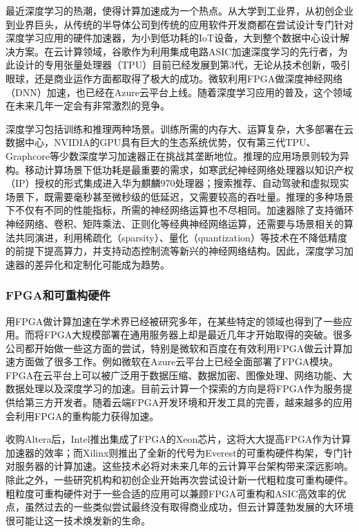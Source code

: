 最近深度学习的热潮，使得计算加速成为一个热点。从大学到工业界，从初创企业到业界巨头，从传统的半导体公司到传统的应用软件开发商都在尝试设计专门针对深度学习应用的硬件加速器，为小到低功耗的IoT设备，大到整个数据中心设计解决方案。在云计算领域，谷歌作为利用集成电路ASIC加速深度学习的先行者，为此设计的专用张量处理器（TPU）目前已经发展到第3代，无论从技术创新，吸引眼球，还是商业运作方面都取得了极大的成功。微软利用FPGA做深度神经网络（DNN）加速，也已经在Azure云平台上线。随着深度学习应用的普及，这个领域在未来几年一定会有非常激烈的竞争。

深度学习包括训练和推理两种场景。训练所需的内存大、运算复杂，大多部署在云数据中心，NVIDIA的GPU具有巨大的生态系统优势，仅有第三代TPU、Graphcore等少数深度学习加速器正在挑战其垄断地位。推理的应用场景则较为异构。移动计算场景下低功耗是最重要的需求，如寒武纪神经网络处理器以知识产权（IP）授权的形式集成进入华为麒麟970处理器；搜索推荐、自动驾驶和虚拟现实场景下，既需要毫秒甚至微秒级的低延迟，又需要较高的吞吐量。推理的多种场景下不仅有不同的性能指标，所需的神经网络运算也不尽相同。加速器除了支持循环神经网络、卷积、矩阵乘法、正则化等经典神经网络运算，还需要与场景相关的算法共同演进，利用稀疏化（sparsity）、量化（quantization）等技术在不降低精度的前提下提高算力，并支持动态控制流等新兴的神经网络结构。因此，深度学习加速器的差异化和定制化可能成为趋势。

\subsubsection{FPGA和可重构硬件}

用FPGA做计算加速在学术界已经被研究多年，在某些特定的领域也得到了一些应用。而将FPGA大规模部署在通用服务器上却是最近几年才开始取得的突破。很多公司都开始做一些这方面的尝试，特别是微软和百度在有效利用FPGA做云计算加速方面做了很多工作。例如微软在Azure云平台上已经全面部署了FPGA模块。FPGA在云平台上可以被广泛用于数据压缩、数据加密、图像处理、网络功能、大数据处理以及深度学习的加速。目前云计算一个探索的方向是将FPGA作为服务提供给第三方开发者。随着云端FPGA开发环境和开发工具的完善，越来越多的应用会利用FPGA的重构能力获得加速。

收购Altera后，Intel推出集成了FPGA的Xeon芯片，这将大大提高FPGA作为计算加速器的效率；而Xilinx则推出了全新的代号为Everest的可重构硬件构架，专门针对服务器的计算加速。这些技术必将对未来几年的云计算平台架构带来深远影响。除此之外，一些研究机构和初创企业开始再次尝试设计新一代粗粒度可重构硬件。粗粒度可重构硬件对于一些合适的应用可以兼顾FPGA可重构和ASIC高效率的优点，虽然过去的一些类似尝试最终没有取得商业成功，但云计算蓬勃发展的大环境很可能让这一技术焕发新的生命。

